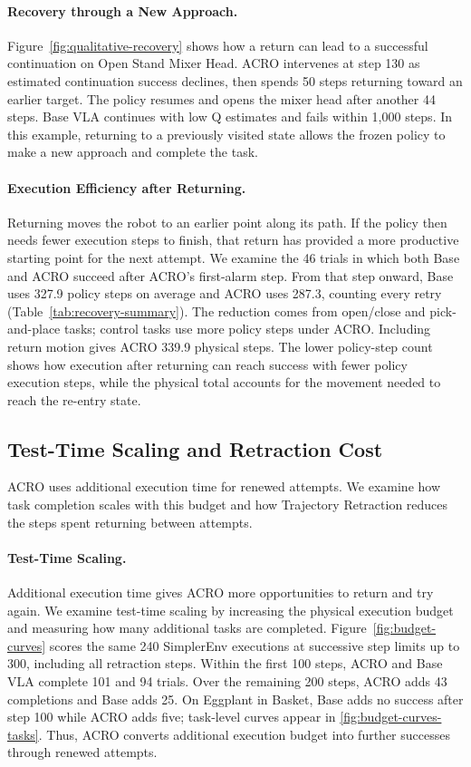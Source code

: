 
\paragraph{Recovery through a New Approach.}
Figure~\ref{fig:qualitative-recovery} shows how a return can lead to a successful continuation on Open Stand Mixer Head. ACRO intervenes at step 130 as estimated continuation success declines, then spends 50 steps returning toward an earlier target. The policy resumes and opens the mixer head after another 44 steps. Base VLA continues with low Q estimates and fails within 1,000 steps. In this example, returning to a previously visited state allows the frozen policy to make a new approach and complete the task.

\paragraph{Execution Efficiency after Returning.}
Returning moves the robot to an earlier point along its path. If the policy then needs fewer execution steps to finish, that return has provided a more productive starting point for the next attempt. We examine the 46 trials in which both Base and ACRO succeed after ACRO's first-alarm step. From that step onward, Base uses 327.9 policy steps on average and ACRO uses 287.3, counting every retry (Table~\ref{tab:recovery-summary}). The reduction comes from open/close and pick-and-place tasks; control tasks use more policy steps under ACRO. Including return motion gives ACRO 339.9 physical steps. The lower policy-step count shows how execution after returning can reach success with fewer policy execution steps, while the physical total accounts for the movement needed to reach the re-entry state.

\subsection{Test-Time Scaling and Retraction Cost}
\label{sec:data-retraction}
ACRO uses additional execution time for renewed attempts. We examine how task completion scales with this budget and how Trajectory Retraction reduces the steps spent returning between attempts.


\paragraph{Test-Time Scaling.}
Additional execution time gives ACRO more opportunities to return and try again. We examine test-time scaling by increasing the physical execution budget and measuring how many additional tasks are completed. Figure~\ref{fig:budget-curves} scores the same 240 SimplerEnv executions at successive step limits up to 300, including all retraction steps. Within the first 100 steps, ACRO and Base VLA complete 101 and 94 trials. Over the remaining 200 steps, ACRO adds 43 completions and Base adds 25. On Eggplant in Basket, Base adds no success after step 100 while ACRO adds five; task-level curves appear in \cref{fig:budget-curves-tasks}. Thus, ACRO converts additional execution budget into further successes through renewed attempts.
\finishwrap[3]

